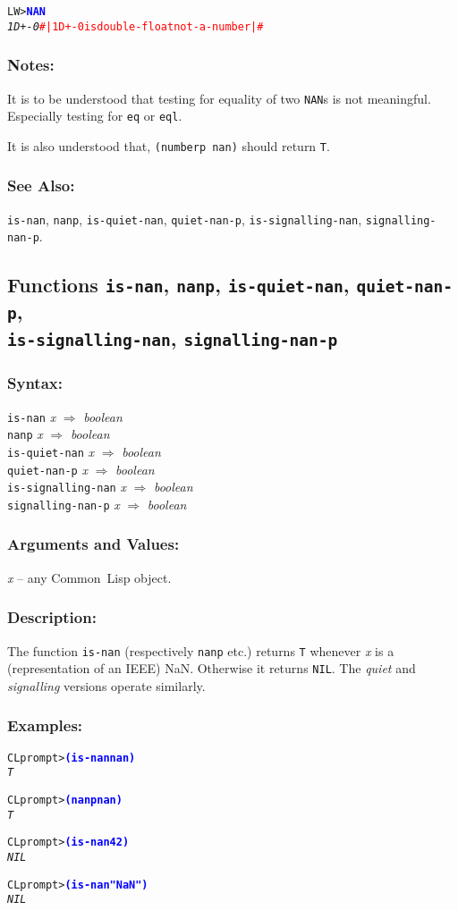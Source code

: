 \documentclass[10pt,fleqn]{article}
\newcommand{\CL}{\textsf{Common~Lisp}}
\newcommand{\code}[1]{\texttt{#1}}
\newcommand{\varname}[1]{\textit{#1}}
\newcommand{\codeprompt}[1]{\textcolor{blue}{\textbf{#1}}}
\newcommand{\DDictionaryItem}[1]{\vspace*{6pt}\noindent\hrulefill\vspace*{-9pt}\subsection*{#1}}
\newcommand{\DSyntax}{\subsubsection*{Syntax:}}
\newcommand{\DArgsNValues}{\subsubsection*{Arguments and Values:}}
\newcommand{\DDescription}{\subsubsection*{Description:}}
\newcommand{\DExamples}{\subsubsection*{Examples:}}
\newcommand{\DNotes}{\subsubsection*{Notes:}}
\newcommand{\DSeeAlso}{\subsubsection*{See Also:}}
\begin{document}
\begin{alltt}
LW> \codeprompt{NAN}
\textit{1D+-0} \textcolor{red}{#| 1D+-0 is double-float not-a-number |#}
\end{alltt}

\DNotes{}

\noindent
It is to be understood that testing for equality of two \code{NAN}s is
not meaningful.  Especially testing for \code{eq} or \code{eql}.

\noindent
It is also understood that, \code{(numberp nan)} should return \code{T}.

\DSeeAlso{}

\code{is-nan}, \code{nanp}, \code{is-quiet-nan}, \code{quiet-nan-p},
\code{is-signalling-nan}, \code{signalling-nan-p}.


\DDictionaryItem{Functions \code{is-nan}, \code{nanp},
  \code{is-quiet-nan}, \code{quiet-nan-p},\\\code{is-signalling-nan},
  \code{signalling-nan-p}}

\DSyntax{}

\code{is-nan} \varname{x} $\Rightarrow$ \textit{boolean}\\
\code{nanp} \varname{x} $\Rightarrow$ \textit{boolean}\\
\code{is-quiet-nan} \varname{x} $\Rightarrow$ \textit{boolean}\\
\code{quiet-nan-p} \varname{x} $\Rightarrow$ \textit{boolean}\\
\code{is-signalling-nan} \varname{x} $\Rightarrow$ \textit{boolean}\\
\code{signalling-nan-p} \varname{x} $\Rightarrow$ \textit{boolean}\\

\DArgsNValues{}

\varname{x} -- any \CL{} object.

\DDescription{}

The function \code{is-nan} (respectively \code{nanp} etc.) returns \code{T}
whenever \varname{x} is a (representation of an IEEE) NaN.  Otherwise
it returns \code{NIL}. The \emph{quiet} and \emph{signalling} versions
operate similarly.

\DExamples{}

\begin{alltt}
CL prompt> \codeprompt{(is-nan nan)}
\textit{T}

CL prompt> \codeprompt{(nanp nan)}
\textit{T}

CL prompt> \codeprompt{(is-nan 42)}
\textit{NIL}

CL prompt> \codeprompt{(is-nan "NaN")}
\textit{NIL}
\end{alltt}
\end{document}
